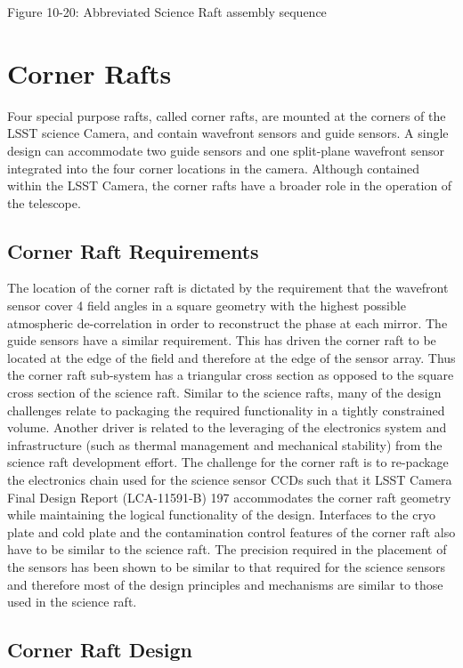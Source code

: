  
 
Figure 10-20: Abbreviated Science Raft assembly sequence

\section{Corner Rafts}

Four special purpose rafts, called corner rafts, are mounted at the corners of the LSST science Camera,
and contain wavefront sensors and guide sensors. A single design can accommodate two guide sensors
and one split-plane wavefront sensor integrated into the four corner locations in the camera. Although
contained within the LSST Camera, the corner rafts have a broader role in the operation of the
telescope.

\subsection{Corner Raft Requirements}

The location of the corner raft is dictated by the requirement that the wavefront sensor cover 4 field
angles in a square geometry with the highest possible atmospheric de-correlation in order to
reconstruct the phase at each mirror. The guide sensors have a similar requirement. This has driven the
corner raft to be located at the edge of the field and therefore at the edge of the sensor array. Thus the
corner raft sub-system has a triangular cross section as opposed to the square cross section of the
science raft. Similar to the science rafts, many of the design challenges relate to packaging the required
functionality in a tightly constrained volume.
Another driver is related to the leveraging of the electronics system and infrastructure (such as thermal
management and mechanical stability) from the science raft development effort. The challenge for the
corner raft is to re-package the electronics chain used for the science sensor CCDs such that it
LSST Camera Final Design Report (LCA-11591-B)
197
accommodates the corner raft geometry while maintaining the logical functionality of the design.
Interfaces to the cryo plate and cold plate and the contamination control features of the corner raft also
have to be similar to the science raft.
The precision required in the placement of the sensors has been shown to be similar to that required for
the science sensors and therefore most of the design principles and mechanisms are similar to those
used in the science raft.

\subsection{Corner Raft Design}

